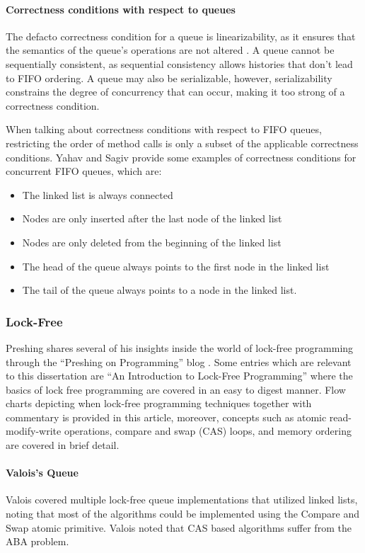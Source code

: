 \documentclass[a4paper, 12pt, titlepage]{article}
\begin{document}
\begin{singlespace}
\paragraph{Correctness conditions with respect to queues}
The defacto correctness condition for a queue is linearizability, as it ensures that the semantics of the queue's operations are not altered \cite{mellor1987concurrent}. A queue cannot be sequentially consistent, as sequential consistency allows histories that don't lead to FIFO ordering. A queue may also be serializable, however, serializability constrains the degree of concurrency that can occur, making it too strong of a correctness condition.

When talking about correctness conditions with respect to FIFO queues, restricting the order of method calls is only a subset of the applicable correctness conditions. Yahav and Sagiv\cite{yahav2003automatically} provide some examples of correctness conditions for concurrent FIFO queues, which are:
\begin{itemize}
  \item The linked list is always connected
  \item Nodes are only inserted after the last node of the linked list
  \item Nodes are only deleted from the beginning of the linked list
  \item The head of the queue always points to the first node in the linked list
  \item The tail of the queue always points to a node in the linked list.
\end{itemize}

\subsubsection{Lock-Free}
\label{lock-free-queues}
Preshing shares several of his insights inside the world of lock-free programming through the ``Preshing on Programming'' blog \cite{preshing}. Some entries which are relevant to this dissertation are ``An Introduction to Lock-Free Programming''\cite{introlockfree} where the basics of lock free programming are covered in an easy to digest manner. Flow charts depicting when lock-free programming techniques together with commentary is provided in this article, moreover, concepts such as atomic read-modify-write operations, compare and swap (CAS) loops, and memory ordering are covered in brief detail. 

\paragraph{Valois's Queue}
Valois covered multiple lock-free queue implementations that utilized linked lists, noting that most of the algorithms could be implemented using the Compare and Swap atomic primitive. Valois noted that CAS based algorithms suffer from the ABA problem. \cite{valois1994implementing}


\end{singlespace}
\end{document}
